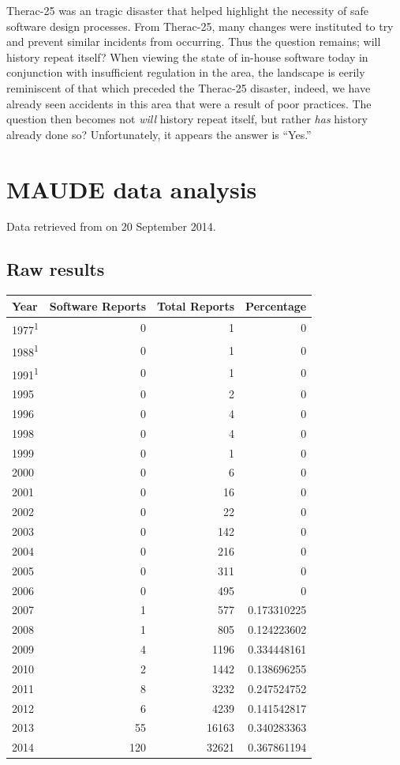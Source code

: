 \documentclass{cshonours}
\newcommand{\ther}{Therac-25\xspace}
\begin{document}
\ther was an tragic disaster that helped highlight the necessity of safe software design processes. From \ther, many changes were instituted to try and prevent similar incidents from occurring. Thus the question remains; will history repeat itself? When viewing the state of in-house software today in conjunction with insufficient regulation in the area, the landscape is eerily reminiscent of that which preceded the \ther disaster, indeed, we have already seen accidents in this area that were a result of poor practices. The question then becomes not \textit{will} history repeat itself, but rather \textit{has} history already done so? Unfortunately, it appears the answer is ``Yes.''


\appendix

\chapter{MAUDE data analysis}

Data retrieved from \cite{maude} on 20 September 2014.

\section{Raw results}

\begin{tabular}{|l|r|r|r|}
\hline
Year & Software Reports & Total Reports & Percentage \\ \hline
1977\textsuperscript{1} & 0 & 1 & 0 \\
1988\textsuperscript{1} & 0 & 1 & 0 \\
1991\textsuperscript{1} & 0 & 1 & 0 \\
1995 & 0 & 2 & 0 \\
1996 & 0 & 4 & 0 \\
1998 & 0 & 4 & 0 \\
1999 & 0 & 1 & 0 \\
2000 & 0 & 6 & 0 \\
2001 & 0 & 16 & 0 \\
2002 & 0 & 22 & 0 \\
2003 & 0 & 142 & 0 \\
2004 & 0 & 216 & 0 \\
2005 & 0 & 311 & 0 \\
2006 & 0 & 495 & 0 \\
2007 & 1 & 577 & 0.173310225 \\
2008 & 1 & 805 & 0.124223602 \\
2009 & 4 & 1196 & 0.334448161 \\
2010 & 2 & 1442 & 0.138696255 \\
2011 & 8 & 3232 & 0.247524752 \\
2012 & 6 & 4239 & 0.141542817 \\
2013 & 55 & 16163 & 0.340283363 \\
2014 & 120 & 32621 & 0.367861194 \\ \hline
\end{tabular}
\end{document}
